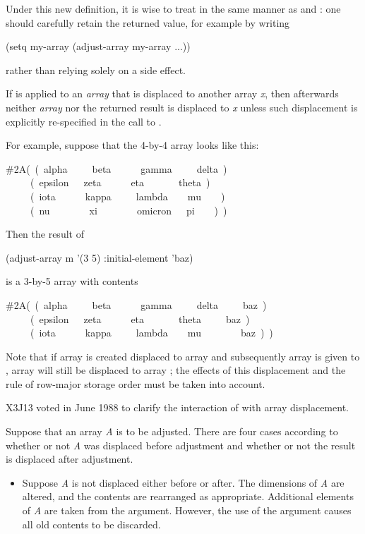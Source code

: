 \begin{defun}[Function]
\begin{newer}
Under this new definition, it is wise to treat 
in the same manner as  and : one should carefully
retain the returned value, for example by writing
\begin{lisp}
(setq my-array (adjust-array my-array ...))
\end{lisp}
rather than relying solely on a side effect.
\end{newer}

If  is applied to an \emph{array} that is displaced
to another array \emph{x}, then afterwards neither \emph{array} nor the returned
result is displaced to \emph{x} unless such displacement is explicitly
re-specified in the call to .

For example, suppose that the 4-by-4 array  looks like this:
\begin{lisp}
\#2A(~(~alpha~~~~~beta~~~~~~gamma~~~~~delta~) \\
~~~~~(~epsilon~~~zeta~~~~~~eta~~~~~~~theta~) \\
~~~~~(~iota~~~~~~kappa~~~~~lambda~~~~mu~~~~) \\
~~~~~(~nu~~~~~~~~xi~~~~~~~~omicron~~~pi~~~~)~)
\end{lisp}
Then the result of
\begin{lisp}
(adjust-array m '(3 5) :initial-element 'baz)
\end{lisp}
is a 3-by-5 array with contents
\begin{lisp}
\#2A(~(~alpha~~~~~beta~~~~~~gamma~~~~~delta~~~~~baz~) \\
~~~~~(~epsilon~~~zeta~~~~~~eta~~~~~~~theta~~~~~baz~) \\
~~~~~(~iota~~~~~~kappa~~~~~lambda~~~~mu~~~~~~~~baz~)~)
\end{lisp}
Note that if array  is created displaced to array  and subsequently
array  is given to , array  will still be
displaced to array ; the effects of this displacement and
the rule of row-major storage order must be taken into account.

\begin{newer}
X3J13 voted in June 1988 
to clarify the interaction of  with array displacement.

Suppose that an array \emph{A} is to be adjusted.  There are four cases
according to whether or not \emph{A} was displaced before adjustment
and whether or not the result is displaced after adjustment.
\begin{itemize}
\item
Suppose \emph{A} is not displaced either before or after.
The dimensions of \emph{A} are altered, and
the contents are rearranged as appropriate.  Additional elements of \emph{A}
are taken from the  argument.
However, the use of the  argument causes all old
contents to be discarded.


\end{itemize}
\end{newer}
\end{defun}
